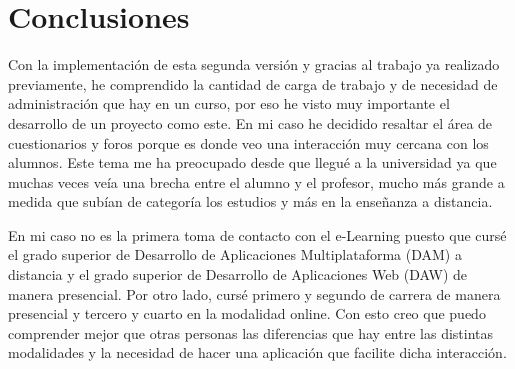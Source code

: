 \section{Conclusiones}
Con la implementación de esta segunda versión y gracias al trabajo ya realizado previamente, he comprendido la cantidad de carga de trabajo y de necesidad de administración que hay en un curso, por eso he visto muy importante el desarrollo de un proyecto como este. En mi caso he decidido resaltar el área de cuestionarios y foros porque es donde veo una interacción muy cercana con los alumnos. Este tema me ha preocupado desde que llegué a la universidad ya que muchas veces veía una brecha entre el alumno y el profesor, mucho más grande a medida que subían de categoría los estudios y más en la enseñanza a distancia.

En mi caso no es la primera toma de contacto con el e-Learning puesto que cursé el grado superior de Desarrollo de Aplicaciones Multiplataforma (DAM) a distancia y el grado superior de Desarrollo de Aplicaciones Web (DAW) de manera presencial. Por otro lado, cursé primero y segundo de carrera de manera presencial y tercero y cuarto en la modalidad online. Con esto creo que puedo comprender mejor que otras personas las diferencias que hay entre las distintas modalidades y la necesidad de hacer una aplicación que facilite dicha interacción.

